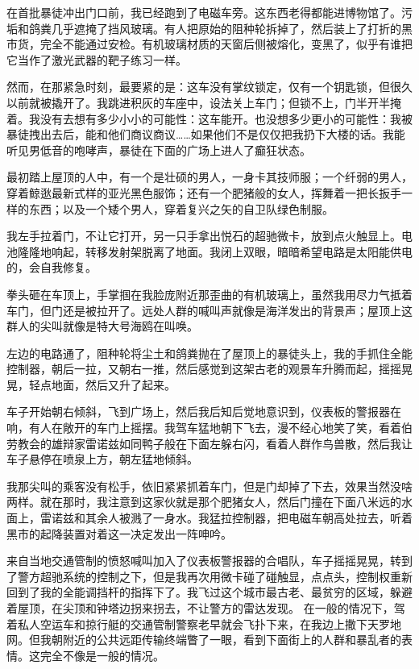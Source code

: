 \documentclass[AutoFakeBold=true]{book}
\begin{document}
在首批暴徒冲出门口前，我已经跑到了电磁车旁。这东西老得都能进博物馆了。污垢和鸽粪几乎遮掩了挡风玻璃。有人把原始的阻种轮拆掉了，然后装上了打折的黑市货，完全不能通过安检。有机玻璃材质的天窗后侧被熔化，变黑了，似乎有谁把它当作了激光武器的靶子练习一样。

然而，在那紧急时刻，最要紧的是：这车没有掌纹锁定，仅有一个钥匙锁，但很久以前就被撬开了。我跳进积灰的车座中，设法关上车门；但锁不上，门半开半掩着。我没有去想有多少小小的可能性：这车能开。也没想多少更小的可能性：我被暴徒拽出去后，能和他们商议商议……如果他们不是仅仅把我扔下大楼的话。我能听见男低音的咆哮声，暴徒在下面的广场上进人了癫狂状态。

最初踏上屋顶的人中，有一个是壮硕的男人，一身卡其技师服；一个纤弱的男人，穿着鲸逖最新式样的亚光黑色服饰；还有一个肥猪般的女人，挥舞着一把长扳手一样的东西；以及一个矮个男人，穿着复兴之矢的自卫队绿色制服。

我左手拉着门，不让它打开，另一只手拿出悦石的超驰微卡，放到点火触显上。电池隆隆地响起，转移发射架脱离了地面。我闭上双眼，暗暗希望电路是太阳能供电的，会自我修复。

拳头砸在车顶上，手掌掴在我脸庞附近那歪曲的有机玻璃上，虽然我用尽力气抵着车门，但门还是被拉开了。远处人群的喊叫声就像是海洋发出的背景声；屋顶上这群人的尖叫就像是特大号海鸥在叫唤。

左边的电路通了，阻种轮将尘土和鸽粪抛在了屋顶上的暴徒头上，我的手抓住全能控制器，朝后一拉，又朝右一推，然后感觉到这架古老的观景车升腾而起，摇摇晃晃，轻点地面，然后又升了起来。

车子开始朝右倾斜，飞到广场上，然后我后知后觉地意识到，仪表板的警报器在响，有人在敞开的车门上摇摆。我驾车猛地朝下飞去，漫不经心地笑了笑，看着伯劳教会的雄辩家雷诺兹如同鸭子般在下面左躲右闪，看着人群作鸟兽散，然后我让车子悬停在喷泉上方，朝左猛地倾斜。

我那尖叫的乘客没有松手，依旧紧紧抓着车门，但是门却掉了下去，效果当然没啥两样。就在那时，我注意到这家伙就是那个肥猪女人，然后门撞在下面八米远的水面上，雷诺兹和其余人被溅了一身水。我猛拉控制器，把电磁车朝高处拉去，听着黑市的起降装置对着这一决定发出一阵呻吟。

来自当地交通管制的愤怒喊叫加入了仪表板警报器的合唱队，车子摇摇晃晃，转到了警方超驰系统的控制之下，但是我再次用微卡碰了碰触显，点点头，控制权重新回到了我的全能调挡杆的指挥下了。我飞过这个城市最古老、最贫穷的区域，躲避着屋顶，在尖顶和钟塔边拐来拐去，不让警方的雷达发现。 在一般的情况下，驾着私人空运车和掠行艇的交通管制警察老早就会飞扑下来，在我边上撒下天罗地网。但我朝附近的公共远距传输终端瞥了一眼，看到下面街上的人群和暴乱者的表情。这完全不像是一般的情况。
\end{document}
